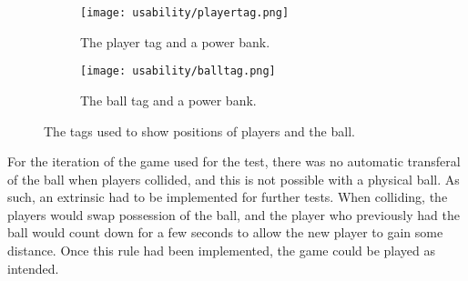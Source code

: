 \begin{figure}[H]
    \centering
    \begin{subfigure}{0.45\textwidth}
        \centering
        \texttt{[image: usability/playertag.png]}
        \caption{The player tag and a power bank.}
        \label{fig:sub1}
    \end{subfigure}
    \begin{subfigure}{0.45\textwidth}
        \centering
        \texttt{[image: usability/balltag.png]}
        \caption{The ball tag and a power bank.}
        \label{fig:sub2}
    \end{subfigure}
    \caption{The tags used to show positions of players and the ball.}
    \label{fig:two-tags}
\end{figure}
\noindent
For the iteration of the game used for the test, there was no automatic transferal of the ball when players collided, and this is not possible with a physical ball.
As such, an extrinsic had to be implemented for further tests.
When colliding, the players would swap possession of the ball, and the player who previously had the ball would count down for a few seconds to allow the new player to gain some distance.
Once this rule had been implemented, the game could be played as intended.

